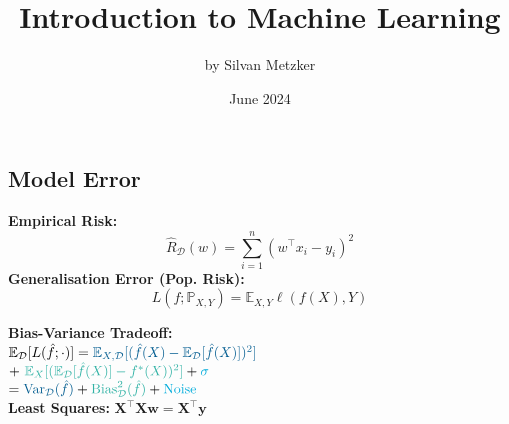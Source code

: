 \documentclass[a4paper,11pt]{article}
\title{Introduction to Machine Learning}
\author{by Silvan Metzker}
\date{June 2024}
\begin{document}
\setlength{\abovedisplayskip}{0pt}
\setlength{\belowdisplayskip}{0pt}
\setlength{\abovedisplayshortskip}{0pt}
\setlength{\belowdisplayshortskip}{0pt}

\setlength{\jot}{0pt}

\setlength{\textfloatsep}{0pt}     %
\setlength{\intextsep}{0pt}        %
\setlength{\abovecaptionskip}{0pt} %
\setlength{\belowcaptionskip}{0pt} %

\subsection*{Model Error}
\textbf{Empirical Risk:} 
$$\textstyle \hat{R}_{\mathcal{D}}(w)=\sum_{i=1}^n\left(w^{\top} x_i-y_i\right)^2$$
\textbf{Generalisation Error (Pop. Risk):}
$$L\left(f ; \mathbb{P}_{X, Y}\right)=\mathbb{E}_{X, Y} \ell(f(X), Y)$$

\textbf{Bias-Variance Tradeoff:} \\
$\mathbb{E}_{\mathcal{D}}[L(\hat{f} ; \cdot)]= \textcolor{pri}{\mathbb{E}_{X, \mathcal{D}}[(\hat{f}(X)- \mathbb{E}_{\mathcal{D}}[\hat{f}(X)])^2]}$\\
\makebox[10pt][l]{} $+\  \textcolor{sec}{\mathbb{E}_X[(\mathbb{E}_{\mathcal{D}}[\hat{f}(X)]-f^*(X))^2]} + \textcolor{tri}{\sigma}$\\
\makebox[10pt][l]{} $= \textcolor{pri}{\operatorname{Var}_{\mathcal{D}}(\hat{f})} + \textcolor{sec}{\operatorname{Bias}_{\mathcal{D}}^2(\hat{f})} + \textcolor{tri}{\text{Noise}}$\\
\textbf{Least Squares:} $\mathbf{X}^{\top} \mathbf{X} \mathbf{w} = \mathbf{X}^{\top} \mathbf{y}$
\end{document}
